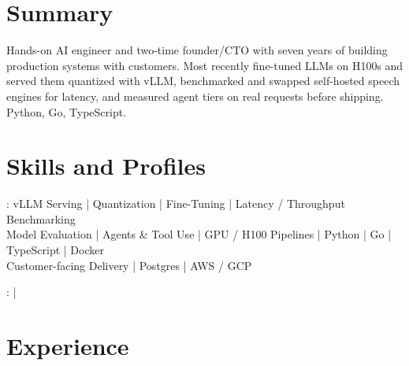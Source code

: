 \documentclass[print]{jack-resume}
\begin{document}
\pagecolor{darkmodeBackground}


\begin{minipage}[t][1cm][t]{.03\textwidth}
    \hfill
\end{minipage}

\section{Summary}
Hands-on AI engineer and two-time founder/CTO with seven years of building production systems with customers. Most recently fine-tuned LLMs on H100s and served them quantized with vLLM, benchmarked and swapped self-hosted speech engines for latency, and measured agent tiers on real requests before shipping. Python, Go, TypeScript.
\sectionsep

\section{Skills and Profiles}
:
vLLM Serving \hfill | \hfill
Quantization \hfill | \hfill
Fine-Tuning \hfill | \hfill
Latency / Throughput Benchmarking \\
\hspace{1.0cm} Model Evaluation \hfill | \hfill
Agents \& Tool Use \hfill | \hfill
GPU / H100 Pipelines \hfill | \hfill
Python \hfill | \hfill
Go \hfill | \hfill
TypeScript \hfill | \hfill
Docker \\
\hspace{1.0cm} Customer-facing Delivery \hfill | \hfill
Postgres \hfill | \hfill
AWS / GCP \\

\raggedright{
    :
      \href{https://www.linkedin.com/in/jack-sturtevant/}{ \ExternalLink} |
     \href{https://github.com/jacksturt}{ \ExternalLink}}

\section{Experience}
\end{document}

